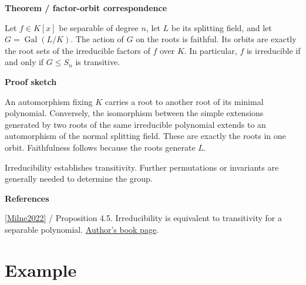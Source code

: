\documentclass[11pt,a4paper,oneside,openany]{book}
\newenvironment{sources}{\par\smallskip\begingroup\footnotesize\color{atlasgray}\leftskip=10pt\setlength{\parskip}{2pt}}{\par\endgroup\smallskip}
\begin{document}
\begin{atlasblock}[standard]
\textbf{\sffamily Theorem  /  factor-orbit correspondence}\par\smallskip
\color{black} Let \(f\in K[x]\) be separable of degree \(n\), let \(L\) be its splitting field, and let \(G=\operatorname{Gal}(L/K)\). The action of \(G\) on the roots is faithful. Its orbits are exactly the root sets of the irreducible factors of \(f\) over \(K\). In particular, \(f\) is irreducible if and only if \(G\le S_n\) is transitive.\par
\end{atlasblock}\color{black}


\begin{atlasblock}[standard]
\textbf{\sffamily Proof sketch}\par\smallskip
\color{black} An automorphism fixing \(K\) carries a root to another root of its minimal polynomial. Conversely, the isomorphism between the simple extensions generated by two roots of the same irreducible polynomial extends to an automorphism of the normal splitting field. These are exactly the roots in one orbit. Faithfulness follows because the roots generate \(L\).\par
\end{atlasblock}\color{black}

\color{black} Irreducibility establishes transitivity. Further permutations or invariants are generally needed to determine the group.\par
\begin{sources}
\textbf{References}\par\smallskip
\noindent\hyperlink{ref:Milne2022}{[Milne2022]} / Proposition 4.5. Irreducibility is equivalent to transitivity for a separable polynomial. \href{https://www.jmilne.org/math/Books/index.html}{Author's book page}.\par
\end{sources}\color{black}
\section{Example}
\end{document}
